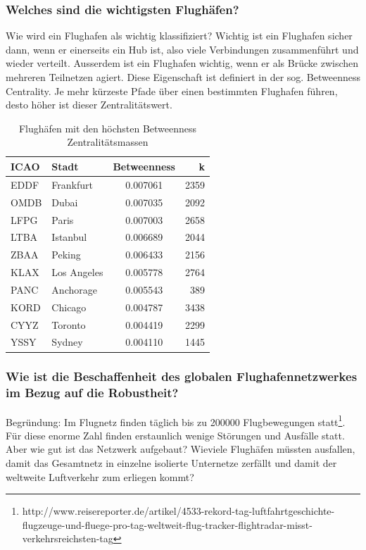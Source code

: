 \subsubsection{Welches sind die wichtigsten Flughäfen?}
Wie wird ein Flughafen als wichtig klassifiziert?
Wichtig ist ein Flughafen sicher dann, wenn er einerseits ein Hub ist, also viele Verbindungen zusammenführt und wieder verteilt.
Ausserdem ist ein Flughafen wichtig, wenn er als Brücke zwischen mehreren Teilnetzen agiert.
Diese Eigenschaft ist definiert in der sog. \guillemotleft Betweenness Centrality\guillemotright.
Je mehr kürzeste Pfade über einen bestimmten Flughafen führen, desto höher ist dieser Zentralitätswert.

\begin{table}
    \centering

\begin{tabular}{l l c r}
ICAO & Stadt & Betweenness & k \\ \hline
EDDF & Frankfurt & 0.007061 & 2359 \\
OMDB & Dubai & 0.007035 & 2092 \\
LFPG & Paris & 0.007003 & 2658 \\
LTBA & Istanbul & 0.006689 & 2044 \\
ZBAA & Peking & 0.006433 & 2156 \\
KLAX & Los Angeles & 0.005778 & 2764 \\
PANC & Anchorage & 0.005543 & 389 \\
KORD & Chicago & 0.004787 & 3438 \\
CYYZ & Toronto & 0.004419 & 2299 \\
YSSY & Sydney & 0.004110 & 1445 \\

\end{tabular}

    \caption{Flughäfen mit den höchsten Betweenness Zentralitätsmassen}
    \label{tbl:between}
\end{table}

\subsubsection{Wie ist die Beschaffenheit des globalen Flughafennetzwerkes im Bezug auf die Robustheit?}
Begründung: Im Flugnetz finden täglich bis zu 200000 Flugbewegungen statt\footnote{http://www.reisereporter.de/artikel/4533-rekord-tag-luftfahrtgeschichte-flugzeuge-und-fluege-pro-tag-weltweit-flug-tracker-flightradar-misst-verkehrsreichsten-tag}.
Für diese enorme Zahl finden erstaunlich wenige Störungen und Ausfälle statt.
Aber wie gut ist das Netzwerk aufgebaut?
Wieviele Flughäfen müssten ausfallen, damit das Gesamtnetz in einzelne isolierte Unternetze zerfällt und damit der weltweite Luftverkehr zum erliegen kommt?

